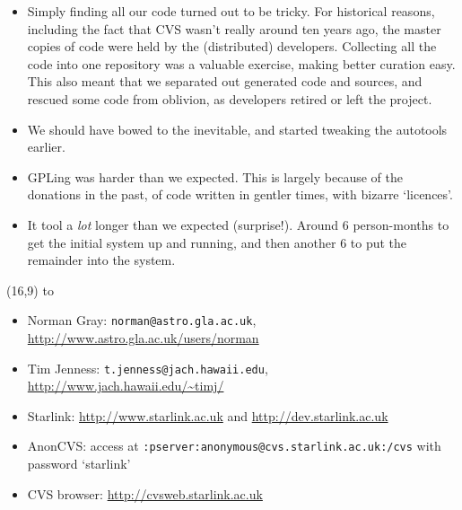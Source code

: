 \documentclass[a0,portrait]{a0poster-ng}
\def\RHead#1{\noindent\hbox to \hsize{\hfil{\LARGE\color{DarkBlue} #1\par}}\bigskip}
\let\Head\RHead
\begin{document}
\begin{textblock}{7}
\begin{itemize}
\item Simply finding all our code turned out to be tricky.  For
  historical reasons, including the fact that CVS wasn't really around
  ten years ago, the master copies of code were held by the
  (distributed) developers.  Collecting all the code into one
  repository was a valuable exercise, making better curation easy.
  This also meant that we separated out generated code and sources, and
  rescued some code from oblivion, as developers retired or left the
  project.

\item We should have bowed to the inevitable, and started tweaking the
  autotools earlier.

\item GPLing was harder than we expected.  This is largely because of
  the donations in the past, of code written in gentler times, with
  bizarre `licences'.

\item It tool a \emph{lot} longer than we expected (surprise!).  Around 6
  person-months to get the initial system up and running, and then
  another 6 to put the remainder into the system.

\end{itemize}

\end{textblock}

\begin{textblock}{7}(16,9)
\Head{Contacts}
\raggedright
\begin{itemize}
\item Norman Gray: \texttt{norman@astro.gla.ac.uk},
  \url{http://www.astro.gla.ac.uk/users/norman}
\item Tim Jenness: \texttt{t.jenness@jach.hawaii.edu},
  \url{http://www.jach.hawaii.edu/~timj/}
\item Starlink: \url{http://www.starlink.ac.uk} and
  \url{http://dev.starlink.ac.uk}
\item AnonCVS: access at
  \texttt{:pserver:anonymous@cvs.starlink.ac.uk:/cvs} 
  with password `starlink'
\item CVS browser: \url{http://cvsweb.starlink.ac.uk}
\end{itemize}
  
\end{textblock}
\end{document}
